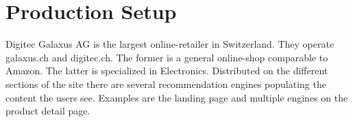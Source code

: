 \section{Production Setup}
Digitec Galaxus AG is the largest online-retailer in Switzerland.
They operate galaxus.ch and digitec.ch. The former is a general online-shop comparable to Amazon. 
The latter is specialized in Electronics.
Distributed on the different sections of the site there are several recommendation engines populating the content the users see.
Examples are the landing page and multiple engines on the product detail page.

